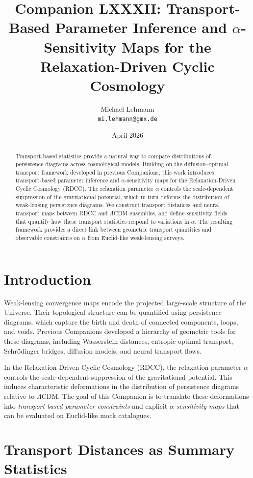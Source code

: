 \documentclass[11pt,a4paper]{article}
\title{\textbf{Companion LXXXII: Transport-Based Parameter Inference and $\alpha$-Sensitivity Maps for the Relaxation-Driven Cyclic Cosmology}}
\author{Michael Lehmann \\ \texttt{mi.lehmann@gmx.de}}
\date{April 2026}
\begin{document}
\maketitle

\begin{abstract}
Transport-based statistics provide a natural way to compare distributions of 
persistence diagrams across cosmological models. Building on the diffusion--optimal 
transport framework developed in previous Companions, this work introduces 
transport-based parameter inference and $\alpha$-sensitivity maps for the 
Relaxation-Driven Cyclic Cosmology (RDCC). The relaxation parameter $\alpha$ 
controls the scale-dependent suppression of the gravitational potential, which in 
turn deforms the distribution of weak-lensing persistence diagrams. We construct 
transport distances and neural transport maps between RDCC and $\Lambda$CDM 
ensembles, and define sensitivity fields that quantify how these transport 
statistics respond to variations in $\alpha$. The resulting framework provides a 
direct link between geometric transport quantities and observable constraints on 
$\alpha$ from Euclid-like weak-lensing surveys.
\end{abstract}
\section{Introduction}

Weak-lensing convergence maps encode the projected large-scale structure of the 
Universe. Their topological structure can be quantified using persistence 
diagrams, which capture the birth and death of connected components, loops, and 
voids. Previous Companions developed a hierarchy of geometric tools for these 
diagrams, including Wasserstein distances, entropic optimal transport, 
Schrödinger bridges, diffusion models, and neural transport flows.

In the Relaxation-Driven Cyclic Cosmology (RDCC), the relaxation parameter 
$\alpha$ controls the scale-dependent suppression of the gravitational potential. 
This induces characteristic deformations in the distribution of persistence 
diagrams relative to $\Lambda$CDM. The goal of this Companion is to translate 
these deformations into \emph{transport-based parameter constraints} and explicit 
\emph{$\alpha$-sensitivity maps} that can be evaluated on Euclid-like mock 
catalogues.
\section{Transport Distances as Summary Statistics}
\end{document}
